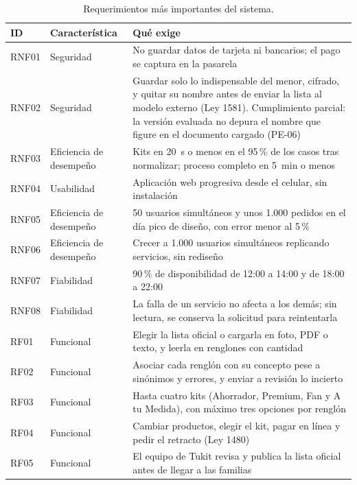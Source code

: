 \begin{table}[htbp]
\centering
\scriptsize
\caption{Requerimientos más importantes del sistema.}
\label{tab:req-resumen}
\begin{tabularx}{\textwidth}{@{}llX@{}}
\toprule
ID & Característica & Qué exige \\
\midrule
RNF01 & Seguridad & No guardar datos de tarjeta ni bancarios; el pago se captura en la pasarela \\
RNF02 & Seguridad & Guardar solo lo indispensable del menor, cifrado, y quitar su nombre antes de enviar la lista al modelo externo (Ley 1581). Cumplimiento parcial: la versión evaluada no depura el nombre que figure en el documento cargado (PE-06) \\
RNF03 & Eficiencia de desempeño & Kits en 20~s o menos en el 95\,\% de los casos tras normalizar; proceso completo en 5~min o menos \\
RNF04 & Usabilidad & Aplicación web progresiva desde el celular, sin instalación \\
RNF05 & Eficiencia de desempeño & 50 usuarios simultáneos y unos 1.000 pedidos en el día pico de diseño, con error menor al 5\,\% \\
RNF06 & Eficiencia de desempeño & Crecer a 1.000 usuarios simultáneos replicando servicios, sin rediseño \\
RNF07 & Fiabilidad & 90\,\% de disponibilidad de 12:00 a 14:00 y de 18:00 a 22:00 \\
RNF08 & Fiabilidad & La falla de un servicio no afecta a los demás; sin lectura, se conserva la solicitud para reintentarla \\
\midrule
RF01 & Funcional & Elegir la lista oficial o cargarla en foto, PDF o texto, y leerla en renglones con cantidad \\
RF02 & Funcional & Asociar cada renglón con su concepto pese a sinónimos y errores, y enviar a revisión lo incierto \\
RF03 & Funcional & Hasta cuatro kits (Ahorrador, Premium, Fan y A tu Medida), con máximo tres opciones por renglón \\
RF04 & Funcional & Cambiar productos, elegir el kit, pagar en línea y pedir el retracto (Ley 1480) \\
RF05 & Funcional & El equipo de Tukit revisa y publica la lista oficial antes de llegar a las familias \\
\bottomrule
\end{tabularx}
\end{table}

